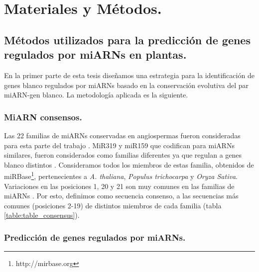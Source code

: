 \graphicspath{{Materials/Figs/}}

\setcounter{chapter}{3}
\chapter*{Materiales y Métodos.} 
\setcounter{figure}{0}
\setcounter{table}{0}
\setcounter{section}{0}

\section{Métodos utilizados para la predicción de genes regulados por miARNs en plantas.}

En la primer parte de esta tesis diseñamos una estrategia para la identificación de genes blanco regulados por miARNs basado en la conservación evolutiva del par miARN-gen blanco.
La metodología aplicada es la siguiente.

\subsection{MiARN consensos.}
Las 22 familias de miARNs conservadas en angiospermas fueron consideradas para esta parte del trabajo \citep{Fahlgren2010,Axtell2008343}.
MiR319 y miR159 que codifican para miARNs similares, fueron considerados como familias diferentes ya que regulan a genes blanco distintos \citep{Palatnik2007}.
Consideramos todos los miembros de estas familia, obtenidos de miRBase\footnote{http://mirbase.org}, pertenecientes a \textit{A. thaliana}, \textit{Populus trichocarpa} y \textit{Oryza Sativa}.
Variaciones en las posiciones 1, 20 y 21 son muy comunes en las familias de miARNs \citep{10.1371/journal.pgen.1002419}. 
Por esto, definimos como secuencia consenso, a las secuencias más comunes (posiciones 2-19) de distintos miembros de cada familia (tabla \ref{table:table_consensus}).

\subsection{Predicción de genes regulados por miARNs.}

